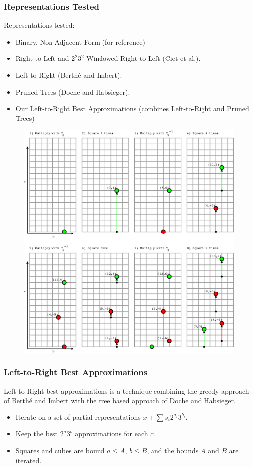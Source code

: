 \documentclass{beamer}
\begin{document}
\begin{frame}
\frametitle{Representations Tested}
Representations tested:
\begin{itemize}
\item Binary, Non-Adjacent Form (for reference)
\item Right-to-Left and $2^2 3^2$ Windowed Right-to-Left (Ciet et al.).
\item Left-to-Right (Berth{\'e} and Imbert).
\item Pruned Trees (Doche and Habsieger).
\item Our Left-to-Right Best Approximations \break (combines Left-to-Right and Pruned Trees)
\end{itemize}
\end{frame}

\begin{frame}
\begin{figure}
\includegraphics[scale=0.46]{yao1}
\end{figure}
\end{frame}


\begin{frame}
\frametitle{Left-to-Right Best Approximations}
Left-to-Right best approximations is a technique combining the greedy approach of Berth{\'e} and Imbert with the tree based approach of Doche and Habsieger.
\begin{itemize}
\item Iterate on a set of partial representations $x + \sum s_i2^{a_i}3^{b_i}$.
\item Keep the best $2^a 3^b$ approximations for each $x$.
\item Squares and cubes are bound $a \le A$, $b \le B$, and the bounds $A$ and $B$ are iterated.
\end{itemize}
\end{frame}
\end{document}
